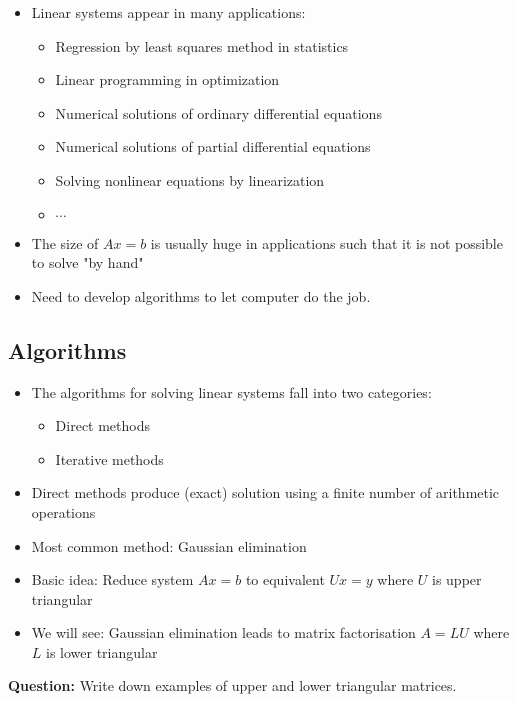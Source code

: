 \documentclass[11pt]{article}
\begin{document}
\begin{itemize}
\item
  Linear systems appear in many applications:

  \begin{itemize}
  \item
    Regression by least squares method in statistics
  \item
    Linear programming in optimization
  \item
    Numerical solutions of ordinary differential equations
  \item
    Numerical solutions of partial differential equations
  \item
    Solving nonlinear equations by linearization
  \item
    \(\cdots\)
  \end{itemize}
\item
  The size of \(A x =b\) is usually huge in applications such that it is
  not possible to solve "by hand"
\item
  Need to develop algorithms to let computer do the job.
\end{itemize}

    \subsection{Algorithms}\label{algorithms}

\begin{itemize}
\item
  The algorithms for solving linear systems fall into two categories:

  \begin{itemize}
  \item
    Direct methods
  \item
    Iterative methods
  \end{itemize}
\item
  Direct methods produce (exact) solution using a finite number of
  arithmetic operations
\item
  Most common method: Gaussian elimination
\item
  Basic idea: Reduce system \(Ax=b\) to equivalent \(Ux=y\) where \(U\)
  is upper triangular
\item
  We will see: Gaussian elimination leads to matrix factorisation
  \(A=LU\) where \(L\) is lower triangular
\end{itemize}

\textbf{Question:} Write down examples of upper and lower triangular
matrices.
\end{document}
